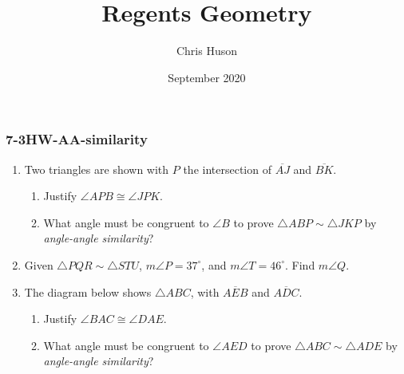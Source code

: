 \documentclass[12pt, twoside]{article}
\title{Regents Geometry}
\author{Chris Huson}
\date{September 2020}
\begin{document}
\subsubsection*{7-3HW-AA-similarity}
\begin{enumerate}
\item Two triangles are shown with $P$ the intersection of $\overline{AJ}$ and $\overline{BK}$.
  \begin{multicols}{2}
    \begin{enumerate}
        \item Justify $\angle APB \cong \angle JPK$.
        \item What angle must be congruent to $\angle B$ to prove $\triangle ABP \sim \triangle JKP$ by \emph{angle-angle similarity}? \vspace{2cm}
        \end{enumerate}
    \end{multicols}
      \vspace{1cm}

\item Given $\triangle PQR \sim \triangle STU$, $m\angle P=37^\circ$, and $m\angle T=46^\circ$. Find $m\angle Q$. \vspace{3cm}

\item The diagram below shows $\triangle ABC$, with $\overline{AEB}$ and $\overline{ADC}$.
    \begin{multicols}{2}
    \begin{enumerate}
      \item Justify $\angle BAC \cong \angle DAE$.
      \item What angle must be congruent to $\angle AED$ to prove $\triangle ABC \sim \triangle ADE$ by \emph{angle-angle similarity}? \vspace{3cm}
    \end{enumerate}
    \end{multicols}


\end{enumerate}
\end{document}
